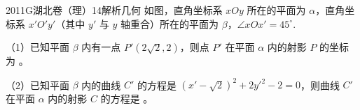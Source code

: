 
\begin{problem}{2011}{G}{湖北卷（理）}{14}{解析几何}
如图，直角坐标系 $xOy$ 所在的平面为 $\alpha$，直角坐标系 $x'O'y'$（其中 $y'$ 与 $y$ 轴重合）所在的平面为 $\beta$，$\angle xOx'=45^\circ$.

（1）已知平面 $\beta$ 内有一点 $P'(2\sqrt{2},2)$，则点 $P'$ 在平面 $\alpha$ 内的射影 $P$ 的坐标为 \underline{\hspace{4em}}。

（2）已知平面 $\beta$ 内的曲线 $C'$ 的方程是 $(x'-\sqrt{2})^2+2y'^2-2=0$，则曲线 $C'$ 在平面 $\alpha$ 内的射影 $C$ 的方程是 \underline{\hspace{4em}}。
\end{problem}

\begin{answer}

\end{answer}

\begin{solutions}

\end{solutions}
